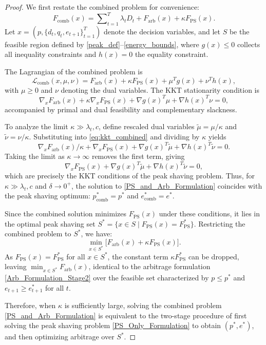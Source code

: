 \documentclass[10pt,a4paper]{amsart}
\begin{document}
\begin{proof}
We first restate the combined problem for convenience:
\begin{equation}
    F_{\text{comb}}(x)=\sum\nolimits_{t=1}^T \lambda_t D_t + F_{\text{arb}}(x) + \kappa F_{\text{PS}}(x). \nonumber
\end{equation}
Let $x=(p,\{d_t,q_t,e_{t+1}\}_{t=1}^T)$ denote the decision variables, and let $S$ be the feasible region defined by \eqref{peak_def}–\eqref{energy_bounds}, where $g(x)\le0$ collects all inequality constraints and $h(x)=0$ the equality constraint.  

The Lagrangian of the combined problem is
\begin{equation}
    \mathcal{L}_{\text{comb}}(x,\mu,\nu)=F_{\text{arb}}(x)+\kappa F_{\text{PS}}(x)+\mu^T g(x)+\nu^T h(x),
\end{equation}
with $\mu\ge0$ and $\nu$ denoting the dual variables. The KKT stationarity condition is
\begin{equation}\label{eq:kkt_combined}
    \nabla_x F_{\text{arb}}(x)+\kappa\nabla_x F_{\text{PS}}(x)+\nabla g(x)^T\mu+\nabla h(x)^T\nu=0,
\end{equation}
accompanied by primal and dual feasibility and complementary slackness.  

To analyze the limit $\kappa \gg \lambda_t, c$, define rescaled dual variables $\tilde{\mu}=\mu/\kappa$ and $\tilde{\nu}=\nu/\kappa$. Substituting into \eqref{eq:kkt_combined} and dividing by $\kappa$ yields
\begin{equation}\label{eq:kkt_rescaled}
   \nabla_x F_{\text{arb}}(x)/\kappa+\nabla_x F_{\text{PS}}(x)+\nabla g(x)^T\tilde{\mu}+\nabla h(x)^T\tilde{\nu}=0.
\end{equation}
Taking the limit as $\kappa\to\infty$ removes the first term, giving
\begin{equation}\label{eq:kkt_ps_stage1}
    \nabla_x F_{\text{PS}}(x)+\nabla g(x)^T\tilde{\mu}+\nabla h(x)^T\tilde{\nu}=0,
\end{equation}
which are precisely the KKT conditions of the peak shaving problem. Thus, for $\kappa\gg\lambda_t, c$ and $\delta\to0^+$, the solution to \eqref{PS_and_Arb_Formulation} coincides with the peak shaving optimum: $p_{\text{comb}}^*=p^*$ and $e_{\text{comb}}^*=e^*$.  

Since the combined solution minimizes $F_{\text{PS}}(x)$ under these conditions, it lies in the optimal peak shaving set $S^*=\{x\in S\mid F_{\text{PS}}(x)=F_{\text{PS}}^*\}$. Restricting the combined problem to $S^*$, we have:
\[
    \min_{x\in S^*}\big[F_{\text{arb}}(x)+\kappa F_{\text{PS}}(x)\big].
\]
As $F_{\text{PS}}(x)=F_{\text{PS}}^*$ for all $x\in S^*$, the constant term $\kappa F_{\text{PS}}^*$ can be dropped, leaving $\min_{x\in S^*}F_{\text{arb}}(x)$, identical to the arbitrage formulation \eqref{Arb_Formulation_Stage2} over the feasible set characterized by $p\le p^*$ and $e_{t+1}\ge e_{t+1}^*$ for all $t$.  

Therefore, when $\kappa$ is sufficiently large, solving the combined problem \eqref{PS_and_Arb_Formulation} is equivalent to the two-stage procedure of first solving the peak shaving problem \eqref{PS_Only_Formulation} to obtain $(p^*,e^*)$, and then optimizing arbitrage over $S^*$.  \end{proof}
\end{document}
